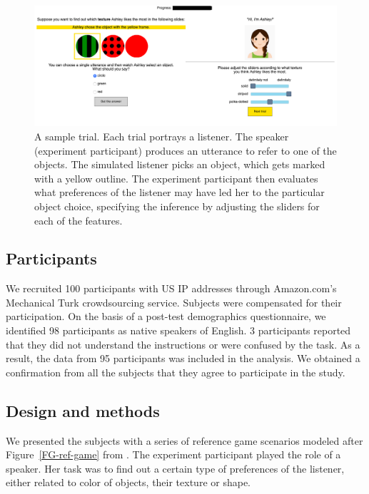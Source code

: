 \documentclass[10pt,a4paper]{article}
\begin{document}
\begin{figure}[ht!]
	\centering
	\includegraphics[width=5.5in]{images/trial.png}
	\caption{ \small{A sample trial. Each trial portrays a listener. The speaker (experiment participant) produces an utterance to refer to one of the objects. The simulated listener picks an object, which gets marked with a yellow outline. The experiment participant then evaluates what preferences of the listener may have led her to the particular object choice, specifying the inference by adjusting the sliders for each of the features}.}
	\label{exp1-trial}
\end{figure}

\subsection{Participants}

We recruited 100 participants with US IP addresses through Amazon.com's Mechanical Turk crowdsourcing service. Subjects were compensated for their participation. On the basis of a post-test demographics questionnaire, we identified 98 participants as native speakers of English. 3 participants reported that they did not understand the instructions or were confused by the task. As a result, the data from 95 participants was included in the analysis. We obtained a confirmation from all the subjects that they agree to participate in the study.

\subsection{Design and methods}

We presented the subjects with a series of reference game scenarios modeled after Figure~\ref{FG-ref-game} from . The experiment participant played the role of a speaker. Her task was to find out a certain type of preferences of the listener, either related to color of objects, their texture or shape. 
\end{document}
